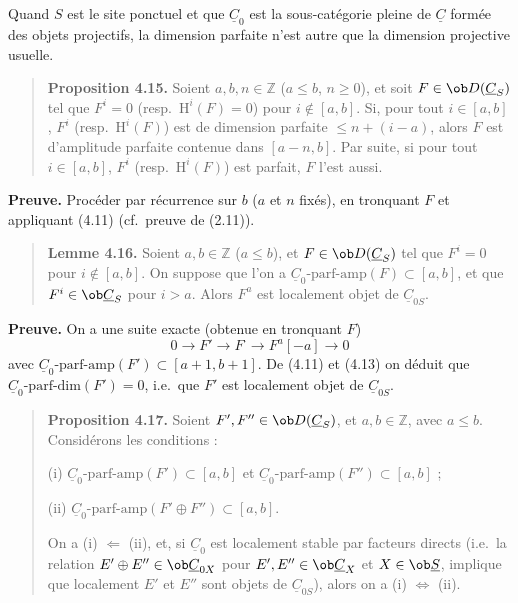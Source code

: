 Quand $S$ est le site ponctuel et que $\underline{C}_0$ est la sous-catégorie pleine de $\underline{C}$ formée des objets projectifs, la dimension parfaite n'est autre que la dimension projective usuelle.

\begin{quote}
\textbf{Proposition 4.15.} Soient $a, b, n \in \mathbb{Z}$ ($a \leqslant b$, $n \geqslant 0$), et soit $F \in \ob D(\underline{C}_S)$ tel que $F^i = 0$ (resp.\ $\mathrm{H}^i(F) = 0$) pour $i \notin [a, b]$. Si, pour tout $i \in [a, b]$, $F^i$ (resp.\ $\mathrm{H}^i(F)$) est de dimension parfaite $\leqslant n + (i-a)$, alors $F$ est d'amplitude parfaite contenue dans $[a-n, b]$. Par suite, si pour tout $i \in [a, b]$, $F^i$ (resp.\ $\mathrm{H}^i(F)$) est parfait, $F$ l'est aussi.
\end{quote}

\textbf{Preuve.} Procéder par récurrence sur $b$ ($a$ et $n$ fixés), en tronquant $F$ et appliquant (4.11) (cf.\ preuve de (2.11)).

\begin{quote}
\textbf{Lemme 4.16.} Soient $a, b \in \mathbb{Z}$ ($a \leqslant b$), et $F \in \ob D(\underline{C}_S)$ tel que $F^i = 0$ pour $i \notin [a, b]$. On suppose que l'on a $\underline{C}_0\text{-parf-amp}(F) \subset [a, b]$, et que $F^i \in \ob \underline{C}_S$ pour $i > a$. Alors $F^a$ est localement objet de $\underline{C}_{0S}$.
\end{quote}

\textbf{Preuve.} On a une suite exacte (obtenue en tronquant $F$)
\[
0 \longrightarrow F' \longrightarrow F^\cdot \longrightarrow F^a[-a] \longrightarrow 0
\]
avec $\underline{C}_0\text{-parf-amp}(F') \subset [a+1, b+1]$. De (4.11) et (4.13) on déduit que $\underline{C}_0\text{-parf-dim}(F') = 0$, i.e.\ que $F'$ est localement objet de $\underline{C}_{0S}$.

\begin{quote}
\textbf{Proposition 4.17.} Soient $F', F'' \in \ob D(\underline{C}_S)$, et $a, b \in \mathbb{Z}$, avec $a \leqslant b$. Considérons les conditions :

(i) $\underline{C}_0\text{-parf-amp}(F') \subset [a, b]$ et $\underline{C}_0\text{-parf-amp}(F'') \subset [a, b]$ ;

(ii) $\underline{C}_0\text{-parf-amp}(F' \oplus F'') \subset [a, b]$.

On a (i) $\Leftarrow$ (ii), et, si $\underline{C}_0$ est localement stable par facteurs directs (i.e.\ la relation $E' \oplus E'' \in \ob \underline{C}_{0X}$ pour $E', E'' \in \ob \underline{C}_X$ et $X \in \ob \underline{S}$, implique que localement $E'$ et $E''$ sont objets de $\underline{C}_{0S}$), alors on a (i) $\Leftrightarrow$ (ii).
\end{quote}


